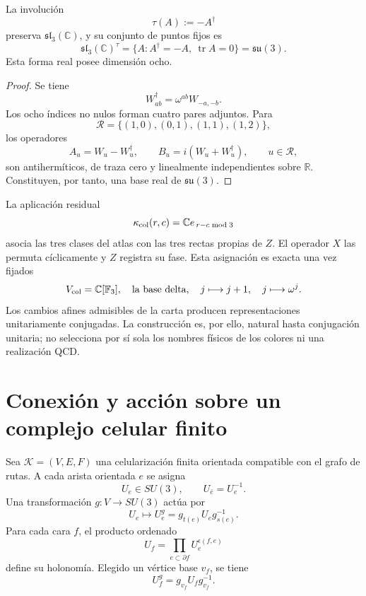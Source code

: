 \begin{corollary}
\label{cor:su3-color-qutrit}
La involución
\[
 \tau(A):=-A^\dagger
\]
preserva \(\mathfrak{sl}_3(\mathbb C)\), y su conjunto de puntos fijos es
\[
 \mathfrak{sl}_3(\mathbb C)^\tau
 =\{A:A^\dagger=-A,\ \operatorname{tr}A=0\}
 =\mathfrak{su}(3).
\]
Esta forma real posee dimensión ocho.
\end{corollary}

\begin{proof}
Se tiene
\[
 W_{ab}^{\dagger}=\omega^{ab}W_{-a,-b}.
\]
Los ocho índices no nulos forman cuatro pares adjuntos. Para
\[
 \mathcal R=\{(1,0),(0,1),(1,1),(1,2)\},
\]
los operadores
\[
 A_u=W_u-W_u^\dagger,
 \qquad
 B_u=i(W_u+W_u^\dagger),
 \qquad u\in\mathcal R,
\]
son antihermíticos, de traza cero y linealmente independientes sobre
\(\mathbb R\). Constituyen, por tanto, una base real de
\(\mathfrak{su}(3)\).
\end{proof}

La aplicación residual
\[
 \kappa_{\rm col}(r,c)
 =\mathbb C e_{\,r-c\bmod3}
\]
asocia las tres clases del atlas con las tres rectas propias de \(Z\). El
operador \(X\) las permuta cíclicamente y \(Z\) registra su fase. Esta
asignación es exacta una vez fijados
\[
 V_{\rm col}=\mathbb C[\mathbb F_3],
 \quad
 \text{la base delta},
 \quad
 j\longmapsto j+1,
 \quad
 j\longmapsto\omega^j.
\]
Los cambios afines admisibles de la carta producen representaciones
unitariamente conjugadas. La construcción es, por ello, natural hasta
conjugación unitaria; no selecciona por sí sola los nombres físicos de los
colores ni una realización QCD.

\section{Conexión y acción sobre un complejo celular finito}
\label{sec:gauge-finito-color}

\begin{construction}
\label{cons:gauge-finito-color}
Sea \(\mathcal K=(V,E,F)\) una celularización finita orientada compatible con
el grafo de rutas. A cada arista orientada \(e\) se asigna
\[
 U_e\in SU(3),
 \qquad
 U_{\bar e}=U_e^{-1}.
\]
Una transformación \(g:V\to SU(3)\) actúa por
\[
 U_e\longmapsto U_e^g
 =g_{t(e)}U_eg_{s(e)}^{-1}.
\]
Para cada cara \(f\), el producto ordenado
\[
 U_f=\prod_{e\subset\partial f}U_e^{\epsilon(f,e)}
\]
define su holonomía. Elegido un vértice base \(v_f\), se tiene
\[
 U_f^g=g_{v_f}U_fg_{v_f}^{-1}.
\]
\end{construction}


